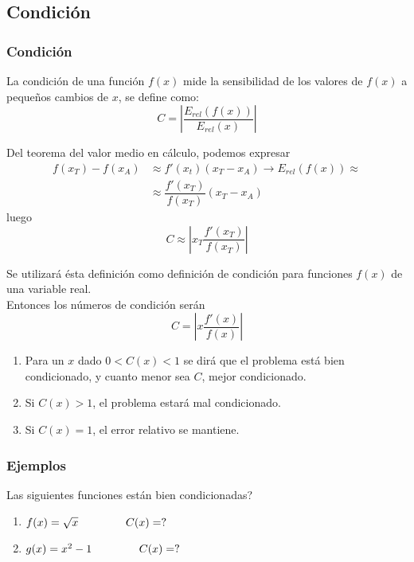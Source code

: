 \subsection{Condición}
\begin{frame}
\frametitle{Condición}
La condición de una función $f(x)$ mide la sensibilidad de los valores de $f(x)$ a pequeños
cambios de $x$, se define como:
\[ C = \left | \dfrac{E_{rel} (f(x))}{E_{rel}(x)} \right |  \]
\end{frame}
\begin{frame}
Del teorema del valor medio en cálculo, podemos expresar
\[ \begin{split} f(x_{T}) - f(x_{A}) & \approx f'(x_{t})(x_{T} - x_{A}) \rightarrow E_{rel}(f(x)) \approx \\ 
 & \approx \dfrac{f'(x_{T})}{f(x_{T})} (x_{T} - x_{A}) \end{split} \]
luego
\[ C \approx \left | x_{T} \dfrac{f'(x_{T})}{f(x_{T})} \right | \]
\end{frame}
\begin{frame}
Se utilizará ésta definición como definición de condición para funciones $f(x)$ de una variable real.
\\
\bigskip
Entonces los números de condición serán
\[ C = \left | x \dfrac{f'(x)}{f(x)} \right | \]
\begin{enumerate}[<+->]
\item Para un $x$ dado $0 < C(x) < 1$ se dirá que el problema está bien condicionado, y cuanto menor sea $C$, mejor condicionado.
\item Si $C(x) > 1$, el problema estará mal condicionado.
\item Si $C(x) = 1$, el error relativo se mantiene.
\end{enumerate}
\end{frame}
\begin{frame}
\frametitle{Ejemplos}
 Las siguientes funciones están bien condicionadas?
\begin{enumerate}
\item $f(x) = \sqrt{x} \hspace{1.5cm} C(x) = ?$
\item $g(x) = x^{2}-1 \hspace{1.5cm} C(x) = ?$
\end{enumerate}
\end{frame}
